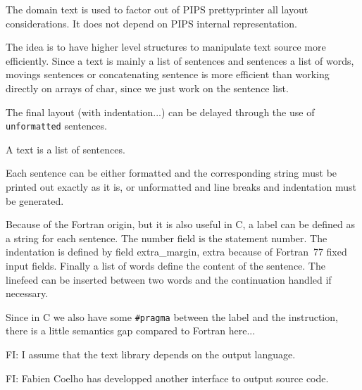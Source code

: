 \documentclass{article}
\begin{document}
\sloppy

The domain text is used to factor out of PIPS prettyprinter all layout
considerations. It does not depend on PIPS internal representation.

The idea is to have higher level structures to manipulate text source more
efficiently. Since a text is mainly a list of sentences and sentences a
list of words, movings sentences or concatenating sentence is more
efficient than working directly on arrays of char, since we just work on
the sentence list.

The final layout (with indentation...) can be delayed through the use of
\verb|unformatted| sentences.


{}

A text is a list of sentences.

{}

Each sentence can be either formatted and the corresponding string
must be printed out exactly as it is, or unformatted and line breaks
and indentation must be generated.

{}

Because of the Fortran origin, but it is also useful in C, a label can
be defined as a string for each sentence. The number field is the
statement number. The indentation is defined by field extra\_margin,
extra because of Fortran~77 fixed input fields. Finally a list of
words define the content of the sentence. The linefeed can be inserted
between two words and the continuation handled if necessary.

Since in C we also have some \verb|#pragma| between the label and the
instruction, there is a little semantics gap compared to Fortran here...

FI: I assume that the text library depends on the output language.

FI: Fabien Coelho has developped another interface to output source code.
\end{document}
